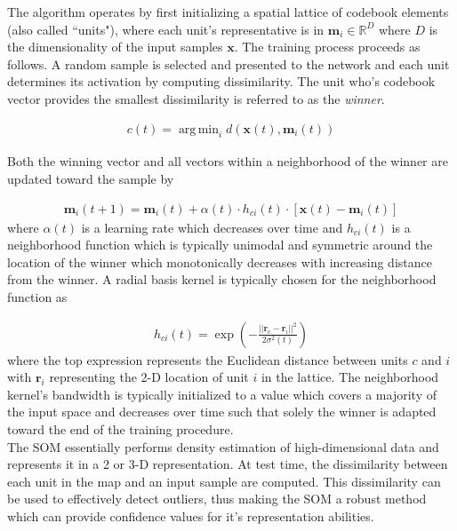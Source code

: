 \documentclass[]{article}
\DeclareMathOperator*{\argmin}{arg\,min}
\begin{document}
	The algorithm operates by first initializing a spatial lattice of codebook elements (also called ``units"), where each unit's representative is in $\bm{m}_i \in \mathbb{R}^{D}$ where $D$ is the dimensionality of the input samples $\bm{x}$.  The training process proceeds as follows.  A random sample is selected and presented to the network and each unit determines its activation by computing dissimilarity.	 The unit who's codebook vector provides the smallest dissimilarity is referred to as the \textit{winner}.
	
	\begin{align*}
		c(t) = \argmin_{i} d(\bm{x}(t),\bm{m}_{i}(t))
	\end{align*}
	\noindent
	
	Both the winning vector and all vectors within a neighborhood of the winner are updated toward the sample by 
	
	\begin{align*}
		\bm{m}_{i}(t+1) = \bm{m}_{i}(t) + \alpha(t) \cdot h_{ci}(t) \cdot [ \bm{x}(t) - \bm{m}_{i}(t) ] 
	\end{align*}
	\noindent
	where $\alpha(t)$ is a learning rate which decreases over time and $h_{ci}(t)$ is a neighborhood function which is typically unimodal and symmetric around the location of the winner which monotonically decreases with increasing distance from the winner.  A radial basis kernel is typically chosen for the neighborhood function as 
	
	\begin{align*}
		 h_{ci}(t) = \exp{\left( -\frac{||\bm{r}_{c} - \bm{r}_i ||^{2}}{2 \sigma^{2}(t)} \right)}
	\end{align*}
	\noindent
	where the top expression represents the Euclidean distance between units $c$ and $i$ with $\bm{r}_{i}$ representing the 2-D location of unit $i$ in the lattice.  The neighborhood kernel's bandwidth is typically initialized to a value which covers a majority of the input space and decreases over time such that solely the winner is adapted toward the end of the training procedure. \\
	
	\noindent
	The SOM essentially performs density estimation of high-dimensional data and represents it in a 2 or 3-D representation.  At test time, the dissimilarity between each unit in the map and an input sample are computed.  This dissimilarity can be used to effectively detect outliers, thus making the SOM a robust method which can provide confidence values for it's representation abilities. \\
	
\end{document}
